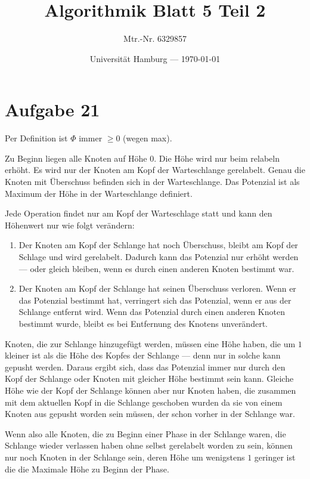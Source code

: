\documentclass[parskip=half,a4paper]{scrartcl}
\title{Algorithmik Blatt 5 Teil 2}
\author{Mtr.-Nr. 6329857}
\date{Universität Hamburg --- \today}
\begin{document}
\maketitle %
\linenumbers

\section*{Aufgabe 21}

Per Definition ist $\Phi$ immer $\ge 0$ (wegen max).

Zu Beginn liegen alle Knoten auf Höhe 0. Die Höhe wird nur beim relabeln erhöht. Es wird nur der Knoten am Kopf der Warteschlange gerelabelt. Genau die Knoten mit Überschuss befinden sich in der Warteschlange. Das Potenzial ist als Maximum der Höhe in der Warteschlange definiert.

Jede Operation findet nur am Kopf der Warteschlage statt und kann den Höhenwert nur wie folgt verändern:

\begin{enumerate}
    \item Der Knoten am Kopf der Schlange hat noch Überschuss, bleibt am Kopf der Schlage und wird gerelabelt. Dadurch kann das Potenzial nur erhöht werden --- oder gleich bleiben, wenn es durch einen anderen Knoten bestimmt war.
    \item Der Knoten am Kopf der Schlange hat seinen Überschuss verloren. Wenn er das Potenzial bestimmt hat, verringert sich das Potenzial, wenn er aus der Schlange entfernt wird. Wenn das Potenzial durch einen anderen Knoten bestimmt wurde, bleibt es bei Entfernung des Knotens unverändert.
\end{enumerate}

Knoten, die zur Schlange hinzugefügt werden, müssen eine Höhe haben, die um $1$ kleiner ist als die Höhe des Kopfes der Schlange --- denn nur in solche kann gepusht werden. Daraus ergibt sich, dass das Potenzial immer nur durch den Kopf der Schlange oder Knoten mit gleicher Höhe bestimmt sein kann. Gleiche Höhe wie der Kopf der Schlange können aber nur Knoten haben, die zusammen mit dem aktuellen Kopf in die Schlange geschoben wurden da sie von einem Knoten aus gepusht worden sein müssen, der schon vorher in der Schlange war.

Wenn also alle Knoten, die zu Beginn einer Phase in der Schlange waren, die Schlange wieder verlassen haben ohne selbst gerelabelt worden zu sein, können nur noch Knoten in der Schlange sein, deren Höhe um wenigstens $1$ geringer ist die die Maximale Höhe zu Beginn der Phase.
\end{document}
